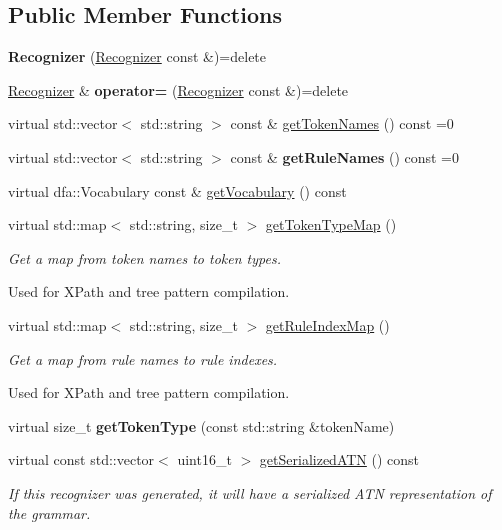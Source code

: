 \subsection*{Public Member Functions}
\begin{DoxyCompactItemize}
\item 
\mbox{\label{classantlr4_1_1Recognizer_af98f5d6eff5b0f2b7e1ac141f94ee4a6}} 
{\bfseries Recognizer} (\hyperlink{classantlr4_1_1Recognizer}{Recognizer} const \&)=delete
\item 
\mbox{\label{classantlr4_1_1Recognizer_a01d08fa2b8bca400b8e785ac6c0ffa4b}} 
\hyperlink{classantlr4_1_1Recognizer}{Recognizer} \& {\bfseries operator=} (\hyperlink{classantlr4_1_1Recognizer}{Recognizer} const \&)=delete
\item 
virtual std\+::vector$<$ std\+::string $>$ const  \& \hyperlink{classantlr4_1_1Recognizer_aef9436cfc73e828229b90a57c8ff2493}{get\+Token\+Names} () const =0
\item 
\mbox{\label{classantlr4_1_1Recognizer_a5dfb52dbae6c4c6f41217769ae90717e}} 
virtual std\+::vector$<$ std\+::string $>$ const  \& {\bfseries get\+Rule\+Names} () const =0
\item 
virtual dfa\+::\+Vocabulary const  \& \hyperlink{classantlr4_1_1Recognizer_aae7ec953d3f35749e62ccb96fa3e0946}{get\+Vocabulary} () const
\item 
virtual std\+::map$<$ std\+::string, size\+\_\+t $>$ \hyperlink{classantlr4_1_1Recognizer_a44e911d62132ccc76375b6c28bc340d5}{get\+Token\+Type\+Map} ()
\begin{DoxyCompactList}\small\item\em Get a map from token names to token types. 

Used for X\+Path and tree pattern compilation. \end{DoxyCompactList}\item 
virtual std\+::map$<$ std\+::string, size\+\_\+t $>$ \hyperlink{classantlr4_1_1Recognizer_a0475c564435567fc8cc6644221727d6a}{get\+Rule\+Index\+Map} ()
\begin{DoxyCompactList}\small\item\em Get a map from rule names to rule indexes. 

Used for X\+Path and tree pattern compilation. \end{DoxyCompactList}\item 
\mbox{\label{classantlr4_1_1Recognizer_a58398895efe6617e791cef6a39762b38}} 
virtual size\+\_\+t {\bfseries get\+Token\+Type} (const std\+::string \&token\+Name)
\item 
virtual const std\+::vector$<$ uint16\+\_\+t $>$ \hyperlink{classantlr4_1_1Recognizer_a06b4b78084e75ebafbbd86008914fb51}{get\+Serialized\+A\+TN} () const
\begin{DoxyCompactList}\small\item\em If this recognizer was generated, it will have a serialized A\+TN representation of the grammar. 


\end{DoxyCompactList}
\end{DoxyCompactItemize}
